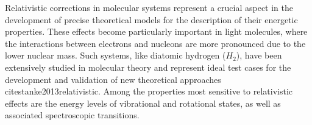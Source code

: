 \documentclass[%
 reprint,
 amsmath,amssymb,
 aps,
]{revtex4-2}
\begin{document}



Relativistic corrections in molecular systems represent a crucial aspect in the development of precise theoretical models for the description of their energetic properties. These effects become particularly important in light molecules, where the interactions between electrons and nucleons are more pronounced due to the lower nuclear mass. Such systems, like diatomic hydrogen ($H_2$), have been extensively studied in molecular theory and represent ideal test cases for the development and validation of new theoretical approaches cite{stanke2013relativistic}. Among the properties most sensitive to relativistic effects are the energy levels of vibrational and rotational states, as well as associated spectroscopic transitions.
\end{document}
